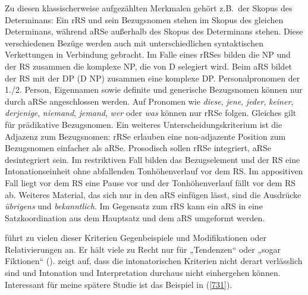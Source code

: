 Zu diesen klassischerweise aufgezählten Merkmalen gehört z.B.\ der Skopus  des Determinans: Ein rRS und sein Bezugsnomen  stehen im Skopus des glei\-chen Determinans, während aRSe außerhalb des Skopus des Determinans stehen. Diese verschiedenen Bezüge werden auch mit unterschiedlichen syntaktischen Verkettungen in Verbindung gebracht. Im Falle eines rRSes bilden die NP und der RS zusammen die komplexe NP, die von D selegiert wird. Beim aRS bildet der RS mit der DP (D NP) zusammen eine komplexe DP. Personalpronomen der 1./2. Person, Eigennamen sowie definite und generische Bezugsnomen können nur durch \mbox{aRSe} angeschlossen werden. Auf Pronomen wie \textit{diese}, \textit{jene}, \textit{jeder}, \textit{keiner}, \textit{derjenige}, \textit{niemand}, \textit{jemand}, \textit{wer} oder \textit{was} können nur rRSe folgen. Glei\-ches gilt für prädikative Bezugsnomen. Ein weiteres Unterscheidungskriterium ist die Adjazenz  zum Bezugsnomen: rRSe erlauben eine non-adjazente Position zum Bezugsnomen einfacher als aRSe. Prosodisch sollen rRSe  integriert, aRSe desintegriert sein. Im restriktiven Fall bilden das Bezugselement und der RS eine Intonationseinheit ohne abfallenden Tonhöhenverlauf vor dem RS. Im appositiven Fall liegt vor dem RS eine Pause vor und der Tonhöhenverlauf fällt vor dem RS ab. Weiteres Material, das sich nur in den aRS einfügen lässt, sind die Ausdrücke \textit{übrigens} und \textit{bekanntlich}. Im Gegensatz zum rRS kann ein aRS in eine Satzkoordination aus dem Hauptsatz und dem aRS umgeformt werden.

\citet[22]{Bluehdorn2007} führt zu vielen dieser Kriterien Gegenbeispiele und Mo\-difikationen oder Relativierungen an. Er hält viele zu Recht nur für „Tendenzen“ oder „sogar Fiktionen“ (\citeyear[30]{Bluehdorn2007}). \citet[191]{Schaffranietz1997} zeigt auf, dass die intonatorischen Kriterien nicht derart verlässlich sind und Intonation und Interpretation durchaus nicht einhergehen können. Interessant für meine spätere Studie ist das Beispiel in (\ref{731}).\largerpage

